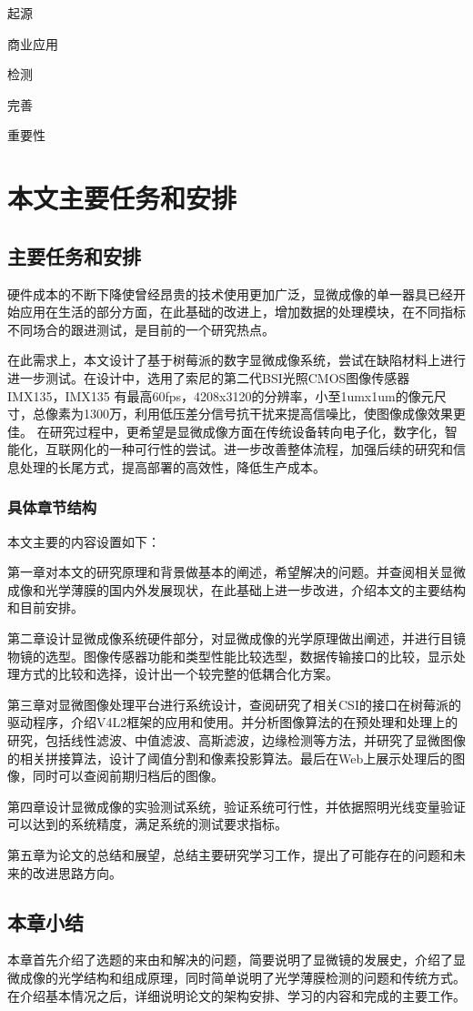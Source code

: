 起源

商业应用

检测

完善

重要性

\section{本文主要任务和安排}
\subsection{主要任务和安排}
硬件成本的不断下降使曾经昂贵的技术使用更加广泛，显微成像的单一器具已经开始应用在生活的部分方面，在此基础的改进上，增加数据的处理模块，在不同指标不同场合的跟进测试，是目前的一个研究热点。

在此需求上，本文设计了基于树莓派的数字显微成像系统，尝试在缺陷材料上进行进一步测试。在设计中，选用了索尼的第二代BSI光照CMOS图像传感器IMX135，IMX135 有最高60fps，4208x3120的分辨率，小至1umx1um的像元尺寸，总像素为1300万，利用低压差分信号抗干扰来提高信噪比，使图像成像效果更佳。
在研究过程中，更希望是显微成像方面在传统设备转向电子化，数字化，智能化，互联网化的一种可行性的尝试。进一步改善整体流程，加强后续的研究和信息处理的长尾方式，提高部署的高效性，降低生产成本。

	
\subsubsection{具体章节结构}
本文主要的内容设置如下：

第一章对本文的研究原理和背景做基本的阐述，希望解决的问题。并查阅相关显微成像和光学薄膜的国内外发展现状，在此基础上进一步改进，介绍本文的主要结构和目前安排。

第二章设计显微成像系统硬件部分，对显微成像的光学原理做出阐述，并进行目镜物镜的选型。图像传感器功能和类型性能比较选型，数据传输接口的比较，显示处理方式的比较和选择，设计出一个较完整的低耦合化方案。

第三章对显微图像处理平台进行系统设计，查阅研究了相关CSI的接口在树莓派的驱动程序，介绍V4L2框架的应用和使用。并分析图像算法的在预处理和处理上的研究，包括线性滤波、中值滤波、高斯滤波，边缘检测等方法，并研究了显微图像的相关拼接算法，设计了阈值分割和像素投影算法。最后在Web上展示处理后的图像，同时可以查阅前期归档后的图像。

第四章设计显微成像的实验测试系统，验证系统可行性，并依据照明光线变量验证可以达到的系统精度，满足系统的测试要求指标。

第五章为论文的总结和展望，总结主要研究学习工作，提出了可能存在的问题和未来的改进思路方向。


\subsection{本章小结}
本章首先介绍了选题的来由和解决的问题，简要说明了显微镜的发展史，介绍了显微成像的光学结构和组成原理，同时简单说明了光学薄膜检测的问题和传统方式。在介绍基本情况之后，详细说明论文的架构安排、学习的内容和完成的主要工作。
